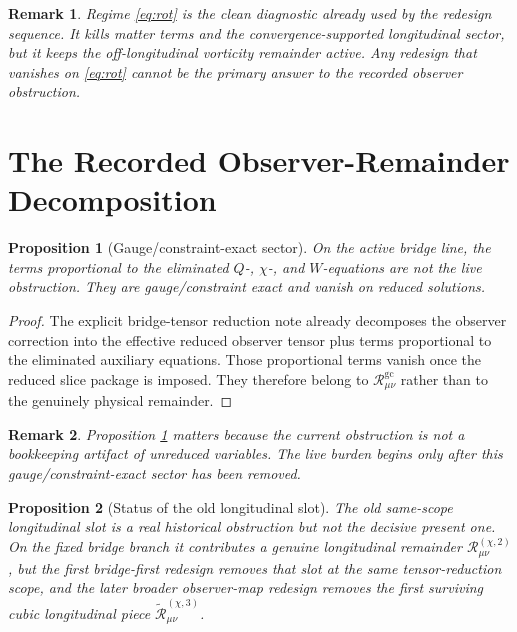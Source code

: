 \documentclass[11pt]{article}
\newcommand{\RemGC}{\mathcal R_{\mu\nu}^{\mathrm{gc}}}
\newcommand{\RemLongOld}{\mathcal R_{\mu\nu}^{(\chi,2)}}
\newcommand{\RemLongThree}{\widetilde{\mathcal R}_{\mu\nu}^{(\chi,3)}}
\newtheorem{proposition}{Proposition}
\newtheorem{remark}{Remark}
\begin{document}
\begin{remark}
Regime \eqref{eq:rot} is the clean diagnostic already used by the redesign sequence. It kills matter terms and the convergence-supported longitudinal sector, but it keeps the off-longitudinal vorticity remainder active. Any redesign that vanishes on \eqref{eq:rot} cannot be the primary answer to the recorded observer obstruction.
\end{remark}

\section{The Recorded Observer-Remainder Decomposition}

\begin{proposition}[Gauge/constraint-exact sector]
\label{prop:gc}
On the active bridge line, the terms proportional to the eliminated \(Q\)-, \(\chi\)-, and \(W\)-equations are not the live obstruction. They are gauge/constraint exact and vanish on reduced solutions.
\end{proposition}

\begin{proof}
The explicit bridge-tensor reduction note already decomposes the observer correction into the effective reduced observer tensor plus terms proportional to the eliminated auxiliary equations. Those proportional terms vanish once the reduced slice package is imposed. They therefore belong to \(\RemGC\) rather than to the genuinely physical remainder.
\end{proof}

\begin{remark}
Proposition \ref{prop:gc} matters because the current obstruction is not a bookkeeping artifact of unreduced variables. The live burden begins only after this gauge/constraint-exact sector has been removed.
\end{remark}

\begin{proposition}[Status of the old longitudinal slot]
\label{prop:longold}
The old same-scope longitudinal slot is a real historical obstruction but not the decisive present one. On the fixed bridge branch it contributes a genuine longitudinal remainder \(\RemLongOld\), but the first bridge-first redesign removes that slot at the same tensor-reduction scope, and the later broader observer-map redesign removes the first surviving cubic longitudinal piece \(\RemLongThree\).
\end{proposition}
\end{document}
